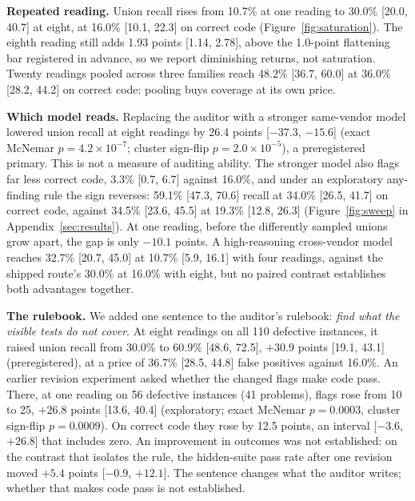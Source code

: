 

\textbf{Repeated reading.} Union recall rises from 10.7\% at one reading to 30.0\% [20.0, 40.7] at
eight, at 16.0\% [10.1, 22.3] on correct code (Figure~\ref{fig:saturation}). The eighth reading still
adds 1.93 points [1.14, 2.78], above the 1.0-point flattening bar registered in advance, so we report
diminishing returns, not saturation. Twenty readings pooled across three families reach 48.2\%
[36.7, 60.0] at 36.0\% [28.2, 44.2] on correct code: pooling buys coverage at its own price.

\textbf{Which model reads.} Replacing the auditor with a stronger same-vendor model lowered union
recall at eight readings by 26.4 points [$-37.3$, $-15.6$] (exact McNemar $p = 4.2\times10^{-7}$;
cluster sign-flip $p = 2.0\times10^{-5}$), a preregistered primary. This is not a measure of auditing
ability. The stronger model also flags far less correct code, 3.3\% [0.7, 6.7] against 16.0\%, and
under an exploratory any-finding rule the sign reverses: 59.1\% [47.3, 70.6] recall at 34.0\%
[26.5, 41.7] on correct code, against 34.5\% [23.6, 45.5] at 19.3\% [12.8, 26.3]
(Figure~\ref{fig:sweep} in Appendix~\ref{sec:results}). At one reading, before the differently
sampled unions grow apart, the gap is only $-10.1$ points. A high-reasoning cross-vendor model reaches
32.7\% [20.7, 45.0] at 10.7\% [5.9, 16.1] with four readings, against the shipped route's 30.0\% at
16.0\% with eight, but no paired contrast establishes both advantages together.

\textbf{The rulebook.} We added one sentence to the auditor's rulebook: \emph{find what the visible tests do not cover}. At eight readings on all 110 defective instances, it raised union recall from 30.0\% to 60.9\% [48.6, 72.5], $+30.9$ points [19.1, 43.1] (preregistered), at a price of 36.7\% [28.5, 44.8] false positives against 16.0\%. An earlier revision experiment asked whether the changed flags make code pass. There, at one reading on 56 defective instances (41 problems), flags rose from 10 to 25, $+26.8$ points [13.6, 40.4] (exploratory; exact McNemar $p = 0.0003$, cluster sign-flip
$p = 0.0009$). On correct code they rose by 12.5 points, an interval [$-3.6$, $+26.8$] that includes
zero. An improvement in outcomes was not established: on the contrast that isolates the rule, the
hidden-suite pass rate after one revision moved $+5.4$ points [$-0.9$, $+12.1$]. The
sentence changes what the auditor writes; whether that makes code pass is not established.

